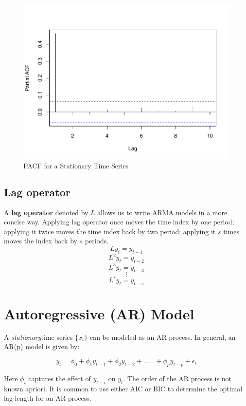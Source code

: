 \documentclass[]{book}
\theoremstyle{definition}
\theoremstyle{definition}
\theoremstyle{definition}
\theoremstyle{remark}
\begin{document}
\begin{figure}

{\centering \includegraphics[width=0.8\linewidth]{bookdown-demo_files/figure-latex/ch6-figure4-1} 

}

\caption{PACF for a Stationary Time Series}\label{fig:ch6-figure4}
\end{figure}

\hypertarget{lag-operator}{%
\subsection{Lag operator}\label{lag-operator}}

A \textbf{lag operator} denoted by \(L\) allows us to write ARMA models in a more concise way. Applying lag operator once moves the time index by one period; applying it twice moves the time index back by two period; applying it \(s\) times moves the index back by \(s\) periods.
\[ Ly_t=y_{t-1} \]
\[ L^2y_t=y_{t-2} \]
\[ L^3y_t=y_{t-3} \]
\[\vdots\]
\[ L^sy_t=y_{t-s} \]

\hypertarget{autoregressive-ar-model}{%
\section{Autoregressive (AR) Model}\label{autoregressive-ar-model}}

A \emph{stationary}time series \(\{x_t\}\) can be modeled as an AR process. In general, an AR(p) model is given by:

\begin{equation}
 y_t = \phi_0 +\phi_1 y_{t-1} + \phi_2 y_{t-2} + ...... + \phi_p y_{t-p}+\epsilon_t
 \end{equation}

Here \(\phi_i\) captures the effect of \(y_{t-i}\) on \(y_t\). The order of the AR process is not known apriori. It is common to use either AIC or BIC to determine the optimal lag length for an AR process.
\end{document}
